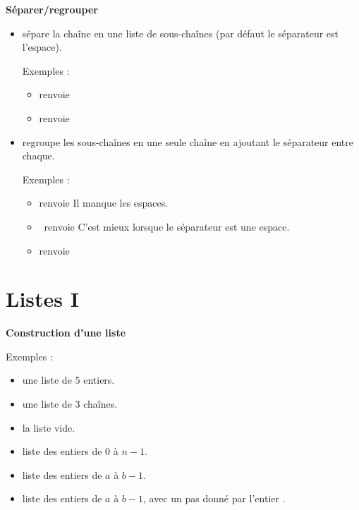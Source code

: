 \documentclass[11pt,class=report,crop=false]{standalone}
\begin{document}
\bigskip

\textbf{Séparer/regrouper}

\begin{itemize}
  \item {} \quad sépare la chaîne en une liste de sous-chaînes (par défaut le séparateur est l'espace).
  
  Exemples : 
  \begin{itemize}  
    \item {} \quad renvoie 
    \item {} \quad renvoie \ci{['12.5', '17.5', '18']}
  \end{itemize}   
  
   \item {} \quad regroupe les sous-chaînes en une seule chaîne en ajoutant le séparateur entre chaque.

   Exemples :
  \begin{itemize}  
    \item {} \quad renvoie  Il manque les espaces.
    \item {} \ renvoie    C'est mieux lorsque le séparateur est une espace.
    \item {}  renvoie
    
  \end{itemize} 
  
  

\end{itemize}


\section{Listes I}

\textbf{Construction d'une liste}

Exemples :
\begin{itemize}
    \item {} \quad une liste de $5$ entiers.
    \item {} \quad une liste de $3$ chaînes.
    \item {} \quad la liste vide.
    \item {} \quad liste des entiers de $0$ à $n-1$.
    \item {} \quad liste des entiers de $a$ à $b-1$.
    \item {} \quad liste des entiers de $a$ à $b-1$, avec un pas donné par l'entier .
  \end{itemize}
  
\end{document}
